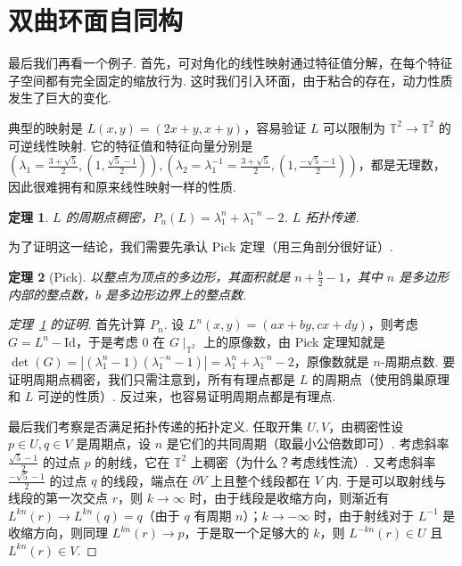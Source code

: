 \documentclass[11pt, a4paper, oneside]{ctexart}
\newtheorem{theorem}{定理}[section]
\newcommand{\T}{\mathbb{T}}
\newcommand{\Id}{\mathrm{Id}}
\newcommand{\abs}[1]{\left|{#1}\right|}
\begin{document}
    \section{双曲环面自同构}
    最后我们再看一个例子. 首先，可对角化的线性映射通过特征值分解，在每个特征子空间都有完全固定的缩放行为. 这时我们引入环面，由于粘合的存在，动力性质发生了巨大的变化.

    典型的映射是 $L(x,y)=(2x+y,x+y)$，容易验证 $L$ 可以限制为 $\T^2\to \T^2$ 的可逆线性映射. 它的特征值和特征向量分别是 $(\lambda_1=\frac{3+\sqrt{5}}{2},(1,\frac{\sqrt{5}-1}{2})),(\lambda_2=\lambda_1^{-1}=\frac{3+\sqrt{5}}{2},(1,\frac{-\sqrt{5}-1}{2}))$，都是无理数，因此很难拥有和原来线性映射一样的性质.

    \begin{theorem}\label{定理5.1}
        $L$ 的周期点稠密，$P_n(L)=\lambda_1^n+\lambda_1^{-n}-2$. $L$ 拓扑传递.
    \end{theorem}
    为了证明这一结论，我们需要先承认 Pick 定理（用三角剖分很好证）.

    \begin{theorem}[Pick]
        以整点为顶点的多边形，其面积就是 $n+\frac{b}{2}-1$，其中 $n$ 是多边形内部的整点数，$b$ 是多边形边界上的整点数.
    \end{theorem}
    \begin{proof}[定理~\ref{定理5.1} 的证明]
        首先计算 $P_n$. 设 $L^n(x,y)=(ax+by,cx+dy)$，则考虑 $G=L^n-\Id$，于是考虑 $0$ 在 $G\mid_{\T^2}$ 上的原像数，由 Pick 定理知就是 $\det(G)=\abs{(\lambda_1^n-1)(\lambda_1^{-n}-1)}=\lambda_1^n+\lambda_1^{-n}-2$，原像数就是 $n$-周期点数. 要证明周期点稠密，我们只需注意到，所有有理点都是 $L$ 的周期点（使用鸽巢原理和 $L$ 可逆的性质）. 反过来，也容易证明周期点都是有理点.

        最后我们考察是否满足拓扑传递的拓扑定义. 任取开集 $U,V$，由稠密性设 $p\in U,q\in V$ 是周期点，设 $n$ 是它们的共同周期（取最小公倍数即可）. 考虑斜率 $\frac{\sqrt{5}-1}{2}$ 的过点 $p$ 的射线，它在 $\T^2$ 上稠密（为什么？考虑线性流）. 又考虑斜率 $\frac{-\sqrt{5}-1}{2}$ 的过点 $q$ 的线段，端点在 $\partial V$ 上且整个线段都在 $V$ 内. 于是可以取射线与线段的第一次交点 $r$，则 $k\to\infty$ 时，由于线段是收缩方向，则渐近有 $L^{kn}(r)\to L^{kn}(q)=q$（由于 $q$ 有周期 $n$）；$k\to -\infty$ 时，由于射线对于 $L^{-1}$ 是收缩方向，则同理 $L^{kn}(r)\to p$，于是取一个足够大的 $k$，则 $L^{-kn}(r)\in U$ 且 $L^{kn}(r)\in V$.
    \end{proof}
\end{document}
